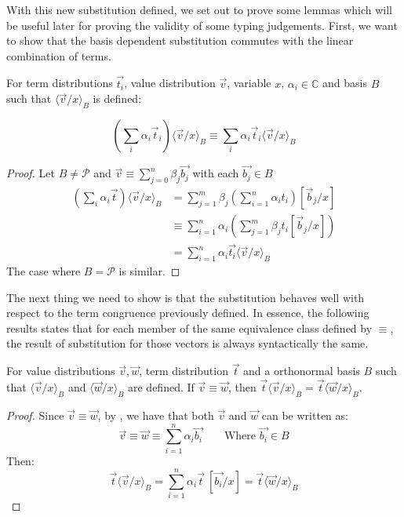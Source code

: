 \documentclass[runningheads,orivec]{llncs}
\newcommand\ansubst[2]{\ensuremath{\langle #1 \rangle_{#2}}}
\newcommand\AbsBasis{\ensuremath{\mathcal{P}}}
\def\C{\mathbb{C}}            %
\begin{document}
With this new substitution defined, we set out to prove some lemmas which will be useful later for proving the validity of some typing judgements. First, we want to show that the basis dependent substitution commutes with the linear combination of terms.

\begin{lemma}\label{lem:distributiveSubstitution}
  For term distributions $\vec{t_i}$, value distribution $\vec{v}$, variable $x$, $\alpha_i\in\C$ and basis $B$ such that $\ansubst{\vec v/x}{B}$ is defined: 
  
  \[(\sum_i \alpha_i\vec t_i)\ansubst{\vec v/x}{B} \equiv \sum_i \alpha_i\vec t_i \ansubst{\vec v/x}{B}\] 
\end{lemma}

\begin{proof}
  Let $B\neq\AbsBasis$ and $\vec{v}\equiv\sum\limits_{j=0}^n \beta_j \vec{b_j}$ with each $\vec{b_j}\in B$
  \begin{align*}
    (\sum_i \alpha_i\vec t)\ansubst{\vec v/x}{B} &= \sum_{j=1}^m \beta_j(\sum_{i=1}^{n} \alpha_i t_i)[\vec b_j/x]\\
    &\equiv \sum_{i=1}^{n} \alpha_i (\sum_{j=1}^m \beta_j t_i [\vec b_j/x])\\
    &= \sum_{i=1}^{n} \alpha_i \vec{t_i}\ansubst{\vec v/x}{B}
  \end{align*}
  The case where $B=\AbsBasis$ is similar.
\end{proof}

The next thing we need to show is that the substitution behaves well with respect to the term congruence previously defined. In essence, the following results states that for each member of the same equivalence class defined by $\equiv$, the result of substitution for those vectors is always syntactically the same.

\begin{lemma}\label{lem:EquivSubstitutions}
  For value distributions $\vec{v},\vec{w}$, term distribution $\vec{t}$ and a orthonormal basis $B$ such that $\ansubst{\vec{v}/x}{B}$ and $\ansubst{\vec{w}/x}{B}$ are defined. If $\vec{v}\equiv\vec{w}$, then $\vec{t}\ansubst{\vec{v}/x}{B}=\vec{t}\ansubst{\vec{w}/x}{B}$.
\end{lemma}

\begin{proof}
  Since $\vec{v}\equiv\vec{w}$, by , we have that both $\vec{v}$ and $\vec{w}$ can be written as:
  \[
  \vec{v} \equiv \vec{w} \equiv \sum_{i=1}^{n} \alpha_i \vec{b_i}\qquad\text{Where }\vec{b_i}\in B
  \]
  Then:
  \[
  \vec{t}\ansubst{\vec{v}/x}{B} = \sum_{i=1}^{n} \alpha_i \vec{t}\ [\vec{b_i}/x] = \vec{t}\ansubst{\vec{w}/x}{B}
  \]
\end{proof}
\end{document}
